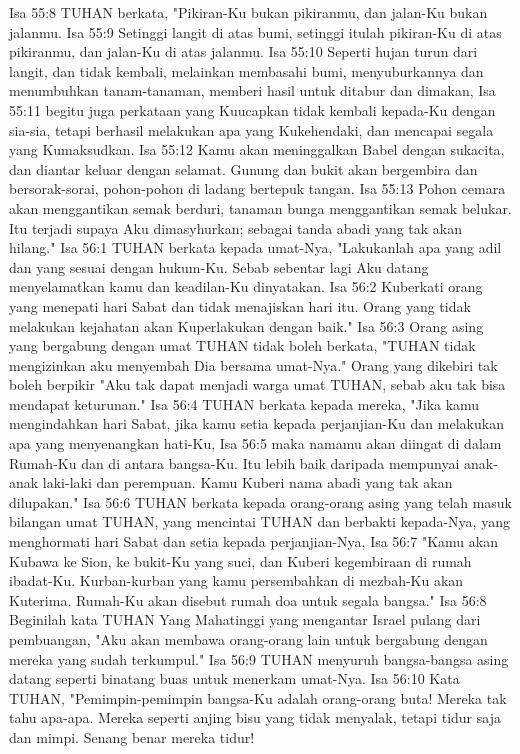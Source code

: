 Isa 55:8  TUHAN berkata, "Pikiran-Ku bukan pikiranmu, dan jalan-Ku bukan jalanmu.
Isa 55:9  Setinggi langit di atas bumi, setinggi itulah pikiran-Ku di atas pikiranmu, dan jalan-Ku di atas jalanmu.
Isa 55:10  Seperti hujan turun dari langit, dan tidak kembali, melainkan membasahi bumi, menyuburkannya dan menumbuhkan tanam-tanaman, memberi hasil untuk ditabur dan dimakan,
Isa 55:11  begitu juga perkataan yang Kuucapkan tidak kembali kepada-Ku dengan sia-sia, tetapi berhasil melakukan apa yang Kukehendaki, dan mencapai segala yang Kumaksudkan.
Isa 55:12  Kamu akan meninggalkan Babel dengan sukacita, dan diantar keluar dengan selamat. Gunung dan bukit akan bergembira dan bersorak-sorai, pohon-pohon di ladang bertepuk tangan.
Isa 55:13  Pohon cemara akan menggantikan semak berduri, tanaman bunga menggantikan semak belukar. Itu terjadi supaya Aku dimasyhurkan; sebagai tanda abadi yang tak akan hilang."
Isa 56:1  TUHAN berkata kepada umat-Nya, "Lakukanlah apa yang adil dan yang sesuai dengan hukum-Ku. Sebab sebentar lagi Aku datang menyelamatkan kamu dan keadilan-Ku dinyatakan.
Isa 56:2  Kuberkati orang yang menepati hari Sabat dan tidak menajiskan hari itu. Orang yang tidak melakukan kejahatan akan Kuperlakukan dengan baik."
Isa 56:3  Orang asing yang bergabung dengan umat TUHAN tidak boleh berkata, "TUHAN tidak mengizinkan aku menyembah Dia bersama umat-Nya." Orang yang dikebiri tak boleh berpikir "Aku tak dapat menjadi warga umat TUHAN, sebab aku tak bisa mendapat keturunan."
Isa 56:4  TUHAN berkata kepada mereka, "Jika kamu mengindahkan hari Sabat, jika kamu setia kepada perjanjian-Ku dan melakukan apa yang menyenangkan hati-Ku,
Isa 56:5  maka namamu akan diingat di dalam Rumah-Ku dan di antara bangsa-Ku. Itu lebih baik daripada mempunyai anak-anak laki-laki dan perempuan. Kamu Kuberi nama abadi yang tak akan dilupakan."
Isa 56:6  TUHAN berkata kepada orang-orang asing yang telah masuk bilangan umat TUHAN, yang mencintai TUHAN dan berbakti kepada-Nya, yang menghormati hari Sabat dan setia kepada perjanjian-Nya,
Isa 56:7  "Kamu akan Kubawa ke Sion, ke bukit-Ku yang suci, dan Kuberi kegembiraan di rumah ibadat-Ku. Kurban-kurban yang kamu persembahkan di mezbah-Ku akan Kuterima. Rumah-Ku akan disebut rumah doa untuk segala bangsa."
Isa 56:8  Beginilah kata TUHAN Yang Mahatinggi yang mengantar Israel pulang dari pembuangan, "Aku akan membawa orang-orang lain untuk bergabung dengan mereka yang sudah terkumpul."
Isa 56:9  TUHAN menyuruh bangsa-bangsa asing datang seperti binatang buas untuk menerkam umat-Nya.
Isa 56:10  Kata TUHAN, "Pemimpin-pemimpin bangsa-Ku adalah orang-orang buta! Mereka tak tahu apa-apa. Mereka seperti anjing bisu yang tidak menyalak, tetapi tidur saja dan mimpi. Senang benar mereka tidur!
